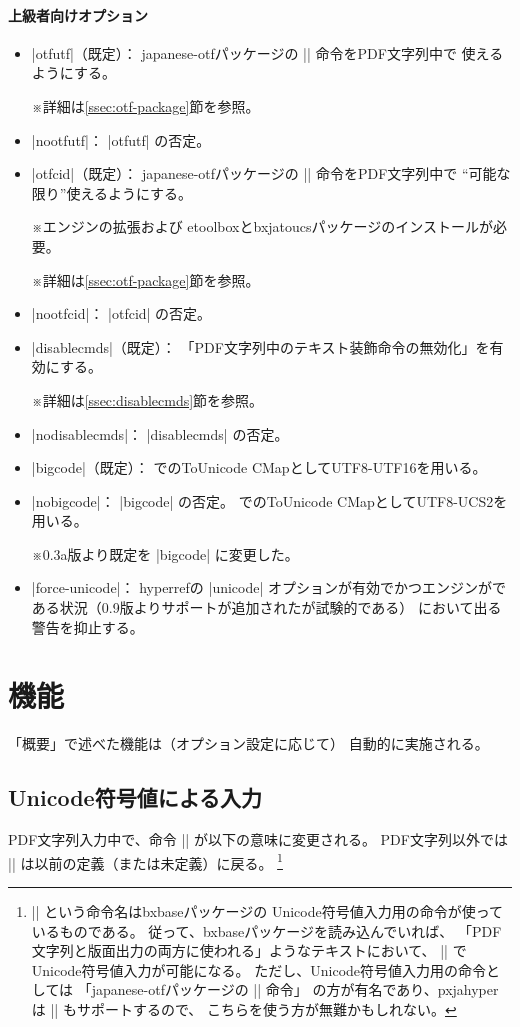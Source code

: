 \documentclass[uplatex,dvipdfmx,a4paper]{jsarticle}
\newcommand{\Pkg}[1]{\textsf{#1}}
\newcommand{\Note}{\par\noindent ※}
\newcommand{\Means}{：\quad}
\providecommand{\Strong}[1]{\textsf{#1}}
\begin{document}
\paragraph{上級者向けオプション}\mbox{}
\begin{itemize}
\item |otfutf|（既定）\Means
  \Pkg{japanese-otf}パッケージの |\UTF| 命令をPDF文字列中で
  使えるようにする。
  \Note 詳細は\ref{ssec:otf-package}節を参照。
\item |nootfutf|\Means
  |otfutf| の否定。
\item |otfcid|（既定）\Means
  \Pkg{japanese-otf}パッケージの |\CID| 命令をPDF文字列中で
  “可能な限り”使えるようにする。
  \Note エンジンの{\eTeX}拡張および
  \Pkg{etoolbox}と\Pkg{bxjatoucs}パッケージのインストールが必要。
  \Note 詳細は\ref{ssec:otf-package}節を参照。
\item |nootfcid|\Means
  |otfcid| の否定。
\item |disablecmds|（既定）\Means
  「PDF文字列中のテキスト装飾命令の無効化」を有効にする。
  \Note 詳細は\ref{ssec:disablecmds}節を参照。
\item |nodisablecmds|\Means
  |disablecmds| の否定。
\item |bigcode|（既定）\Means
  {\upTeX}でのToUnicode CMapとしてUTF8-UTF16を用いる。
\item |nobigcode|\Means
  |bigcode| の否定。
  {\upTeX}でのToUnicode CMapとしてUTF8-UCS2を用いる。
  \Note 0.3a版より既定を |bigcode| に変更した。
\item |force-unicode|\Means
  \Pkg{hyperref}の |unicode| オプションが有効でかつエンジンが{\pTeX}で
  ある状況（0.9版よりサポートが追加されたが\Strong{試験的}である）
  において出る警告を抑止する。
\end{itemize}

\section{機能}

「概要」で述べた機能は（オプション設定に応じて）
自動的に実施される。

\subsection{Unicode符号値による入力}
\label{ssec:ux-command}

PDF文字列入力中で、命令 |\Ux| が以下の意味に変更される。
PDF文字列以外では |\Ux| は以前の定義（または未定義）に戻る。
\footnote{|\Ux| という命令名は\Pkg{bxbase}パッケージの
Unicode符号値入力用の命令が使っているものである。
従って、\Pkg{bxbase}パッケージを読み込んでいれば、
「PDF文字列と版面出力の両方に使われる」ようなテキストにおいて、
|\Ux| でUnicode符号値入力が可能になる。
ただし、Unicode符号値入力用の命令としては
「\Pkg{japanese-otf}パッケージの |\UTF| 命令」
の方が有名であり、\Pkg{pxjahyper}は |\UTF| もサポートするので、
こちらを使う方が無難かもしれない。}
\end{document}
